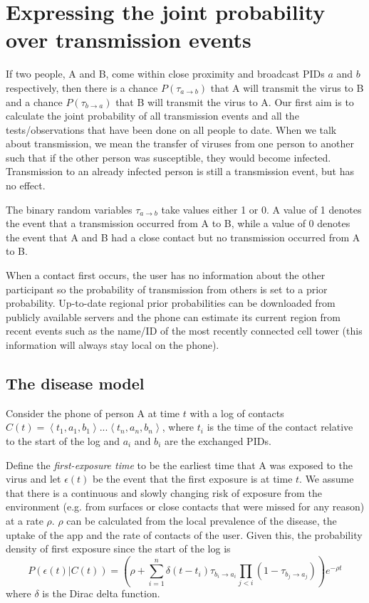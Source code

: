 \documentclass{article}
\begin{document}
\section{Expressing the joint probability over transmission events}

If two people, A and B, come within close proximity and broadcast PIDs $a$ and $b$ respectively, then there is a chance $P(\tau_{a \rightarrow b})$ that A will transmit the virus to B and a chance $P(\tau_{b \rightarrow a})$ that B will transmit the virus to A. Our first aim is to calculate the joint probability of all transmission events and all the tests/observations that have been done on all people to date. When we talk about transmission, we mean the transfer of viruses from one person to another such that if the other person was susceptible, they would become infected. Transmission to an already infected person is still a transmission event, but has no effect.

The binary random variables $\tau_{a\rightarrow b}$ take values either 1 or 0. A value of 1 denotes the event that a transmission occurred from A to B, while a value of 0 denotes the event that A and B had a close contact but no transmission occurred from A to B.

When a contact first occurs, the user has no information about the other participant so the probability of transmission from others is set to a prior probability. Up-to-date regional prior probabilities can be downloaded from publicly available servers and the phone can estimate its current region from recent events such as the name/ID of the most recently connected cell tower (this information will always stay local on the phone).

\subsection{The disease model}

Consider the phone of person A at time $t$ with a log of contacts $C(t) = \left< t_{1},a_1,b_1 \right> ... \left< t_{n},a_n,b_n \right>$, where $t_i$ is the time of the contact relative to the start of the log and $a_i$ and $b_i$ are the exchanged PIDs.

Define the \textit{first-exposure time} to be the earliest time that A was exposed to the virus and let $\epsilon(t)$ be the event that the first exposure is at time $t$. We assume that there is a continuous and slowly changing risk of exposure from the environment (e.g. from surfaces or close contacts that were missed for any reason) at a rate $\rho$. $\rho$ can be calculated from the local prevalence of the disease, the uptake of the app and the rate of contacts of the user. Given this, the probability density of first exposure since the start of the log is
\begin{equation}
P\left(\epsilon(t)|C(t)\right) = \left(\rho + \sum_{i=1}^n \delta(t - t_i)\tau_{b_i\rightarrow a_i} \prod_{j<i}(1-\tau_{b_j\rightarrow a_j})\right) e^{-\rho t}
\label{firstExposure}
\end{equation}
where $\delta$ is the Dirac delta function.
\end{document}
